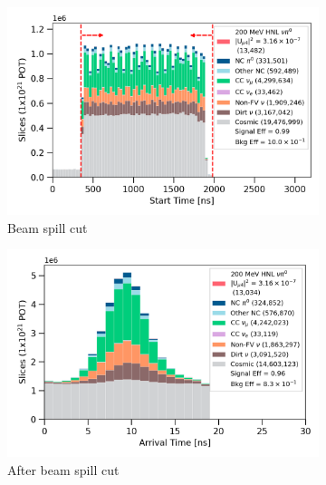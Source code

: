 \begin{figure}[h!]
        \centering
        \begin{subfigure}[b]{0.495\textwidth}
            \centering
            \includegraphics[width=\textwidth]{beamspill}
            \caption{Beam spill cut}%
            \label{fig:beamspill_cut}
        \end{subfigure}
        \hfill
        \begin{subfigure}[b]{0.495\textwidth}  
            \centering 
            \includegraphics[width=\textwidth]{beam_bucket_post_beamspill}
            \caption{After beam spill cut}%
            \label{fig:bb_beamspill}
        \end{subfigure}
        \begin{subfigure}[b]{0.495\textwidth}   
            \centering 

\end{subfigure}
\end{figure}
